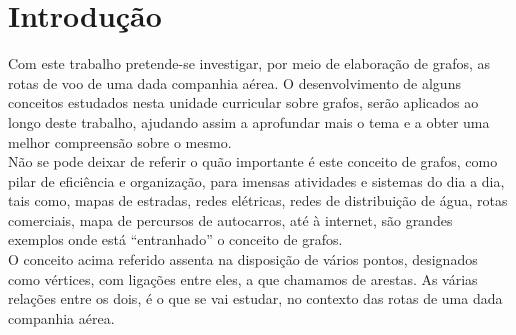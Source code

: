 \chapter{Introdução}
Com este trabalho pretende-se investigar, por meio de elaboração de grafos, as rotas de voo de uma dada 
companhia aérea. O desenvolvimento de alguns conceitos estudados nesta unidade curricular sobre grafos, 
serão aplicados ao longo deste trabalho, ajudando assim a aprofundar mais o tema e a obter uma melhor 
compreensão sobre o mesmo.\\
\indent Não se pode deixar de referir o quão importante é este conceito de grafos, como pilar de eficiência e
organização, para imensas atividades e sistemas do dia a dia, tais como, mapas de estradas, redes elétricas, 
redes de distribuição de água, rotas comerciais, mapa de percursos de autocarros, até à internet, são grandes 
exemplos onde está “entranhado” o conceito de grafos.\\
\indent O conceito acima referido assenta na disposição de vários pontos, designados como vértices, com ligações
entre eles, a que chamamos de arestas. As várias relações entre os dois, é o que se vai estudar, no contexto das 
rotas de uma dada companhia aérea.